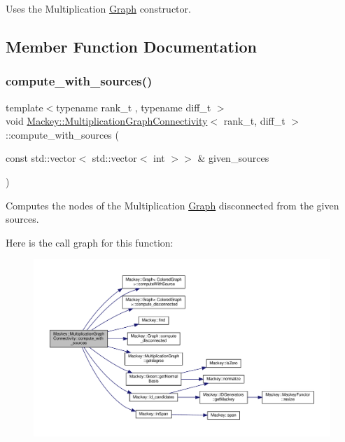 Uses the Multiplication \hyperlink{classMackey_1_1Graph}{Graph} constructor. 



\subsection{Member Function Documentation}
\mbox{\label{classMackey_1_1MultiplicationGraphConnectivity_a81e8f3efb867ea951573a2a5ca5825ed}} 
\subsubsection{\texorpdfstring{compute\+\_\+with\+\_\+sources()}{compute\_with\_sources()}}
{\footnotesize\ttfamily template$<$typename rank\+\_\+t , typename diff\+\_\+t $>$ \\
void \hyperlink{classMackey_1_1MultiplicationGraphConnectivity}{Mackey\+::\+Multiplication\+Graph\+Connectivity}$<$ rank\+\_\+t, diff\+\_\+t $>$\+::compute\+\_\+with\+\_\+sources (\begin{DoxyParamCaption}\item[{const std\+::vector$<$ std\+::vector$<$ int $>$$>$ \&}]{given\+\_\+sources }\end{DoxyParamCaption})}



Computes the nodes of the Multiplication \hyperlink{classMackey_1_1Graph}{Graph} disconnected from the given sources. 

Here is the call graph for this function\+:\nopagebreak
\begin{figure}[H]
\begin{center}
\leavevmode
\includegraphics[width=350pt]{classMackey_1_1MultiplicationGraphConnectivity_a81e8f3efb867ea951573a2a5ca5825ed_cgraph}
\end{center}
\end{figure}


